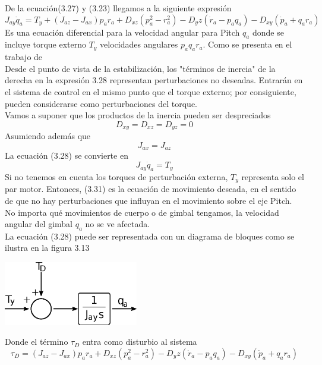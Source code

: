 De la ecuación(3.27) y (3.23) llegamos a la siguiente expresión
\begin{equation}
	J_{ay}\dot{q}_a = T_y + (J_{az} - J_{ax})p_ar_a + D_{xz}(p^2_a - r^2_a) - D_yz(\dot{r}_a - p_aq_a)-D_{xy}(\dot{p}_a + q_ar_a)
\end{equation}
Es una ecuación diferencial para la velocidad angular para Pitch $q_a$ donde se incluye
torque externo $T_y$ velocidades angulares $p_a q_a r_a$. Como se presenta en el trabajo de
\cite{Paper::Yoon2001} \\
Desde el punto de vista de la estabilización, los "términos de inercia" de la derecha en la expresión 3.28
representan perturbaciones no deseadas. Entrarán en el sistema de control en el mismo
punto que el torque externo; por consiguiente, pueden considerarse como perturbaciones del torque.
\\
Vamos a suponer que los productos de la inercia pueden ser despreciados
\begin{equation}
	D_{xy} = D_{xz} = D_{yz} = 0
\end{equation}
Asumiendo además que
\begin{equation}
	J_{ax} = J_{az}
\end{equation}
La ecuación (3.28) se convierte en
\begin{equation}
	J_{ay}\dot{q}_a = T_y
\end{equation}
Si no tenemos en cuenta los torques de perturbación externa, $T_y$ representa solo el
par motor. Entonces, (3.31) es la ecuación de movimiento deseada, en el sentido de que
no hay perturbaciones que influyan en el movimiento sobre el eje Pitch. No importa qué
movimientos de cuerpo o de gimbal tengamos, la velocidad angular del gimbal $q_a$ no se
ve afectada.\\
La ecuación (3.28) puede ser representada con un diagrama de bloques como se ilustra
en la figura 3.13
\begin{center}
	\includegraphics[width=0.44\textwidth]{Contenido/Cuerpo/Capitulo3/Fig21.eps}
	\label{fig:ModeloMat:Fig1}
\end{center}
Donde el término $\tau_D$ entra como disturbio al sistema
\begin{equation}
	\tau_D = (J_{az} - J_{ax})p_ar_a + D_{xz}(p^2_a - r^2_a) - D_yz(\dot{r}_a - p_aq_a)-D_{xy}(\dot{p}_a + q_ar_a)
\end{equation}

